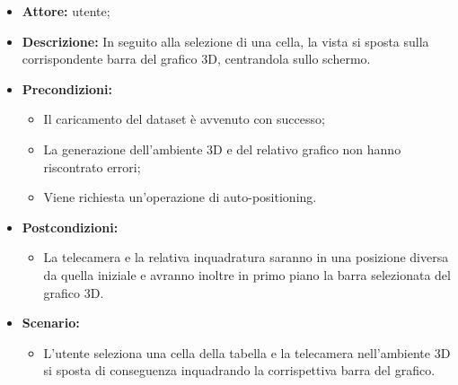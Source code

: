 \begin{itemize}    
    \item \textbf{Attore:} utente;
    \item \textbf{Descrizione:} In seguito alla selezione di una cella, la vista si sposta sulla corrispondente barra del grafico 3D, centrandola sullo schermo.
    \item \textbf{Precondizioni:}    
        \begin{itemize}
            \item Il caricamento del dataset è avvenuto con successo;
            \item La generazione dell'ambiente 3D e del relativo grafico non hanno riscontrato errori;
            \item Viene richiesta un'operazione di auto-positioning.
        \end{itemize}    
    \item \textbf{Postcondizioni:}
        \begin{itemize}
            \item La telecamera e la relativa inquadratura saranno in una posizione diversa da quella iniziale e avranno inoltre in primo piano la barra selezionata del grafico 3D.
        \end{itemize}    
    \item \textbf{Scenario:} 
        \begin{itemize}
            \item L'utente seleziona una cella della tabella e la telecamera nell'ambiente 3D si sposta di conseguenza inquadrando la corrispettiva barra del grafico.
        \end{itemize}
\end{itemize}




